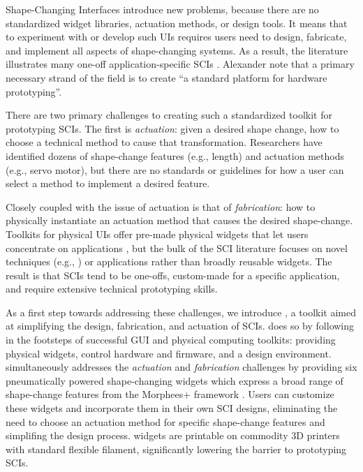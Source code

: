     Shape-Changing Interfaces introduce new problems, because there are no
    standardized widget libraries, actuation methods, or design tools. It
    means that to experiment with or develop such UIs requires users need to
    design, fabricate, and implement all aspects of shape-changing systems. As
    a result, the literature illustrates many one-off application-specific
    SCIs \cite{Sturdee:2018ce}. Alexander \etal note that a primary necessary
    strand of the field is to create ``a standard platform for hardware
    prototyping''.
    
    There are two primary challenges to creating such a standardized toolkit
    for prototyping SCIs. The first is \textit{actuation}: given a
    desired shape change, how to choose a technical method to cause that
    transformation. Researchers have identified dozens of shape-change
    features \cite{10.1145/3173574.3174193} (e.g., length) and actuation
    methods \cite{Sturdee:2018ce} (e.g., servo motor), but there are no
    standards or guidelines for how a user can select a method to implement a
    desired feature.
    
    Closely coupled with the issue of actuation is that of
    \textit{fabrication}: how to physically instantiate an actuation method
    that causes the desired shape-change. Toolkits for physical UIs offer
    pre-made physical widgets that let users concentrate on applications
    \cite{Greenberg:2001,Bdeir:2009kz}, but the bulk of the SCI literature
    focuses on novel techniques (e.g., \cite{10.1145/2984511.2984520}) or
    applications rather than broadly reusable widgets. The result is that SCIs
    tend to be one-offs, custom-made for a specific application, and require
    extensive technical prototyping skills.
  
    As a first step towards addressing these challenges, we introduce \mp, a
    toolkit aimed at simplifying the design, fabrication, and actuation of
    SCIs. \mp does so by following in the footsteps of successful GUI
    and physical computing toolkits: providing physical widgets, control
    hardware and firmware, and a design environment. \mp simultaneously
    addresses the \textit{actuation} and \textit{fabrication} challenges by
    providing six pneumatically powered shape-changing widgets which express a
    broad range of shape-change features from the Morphees+ framework
    \cite{10.1145/3173574.3174193}. Users can customize these widgets and
    incorporate them in their own SCI designs, eliminating the need to choose
    an actuation method for specific shape-change features and simplifing the
    design process. \mp widgets are printable on commodity 3D printers with
    standard flexible filament, significantly lowering the barrier to
    prototyping SCIs. 

